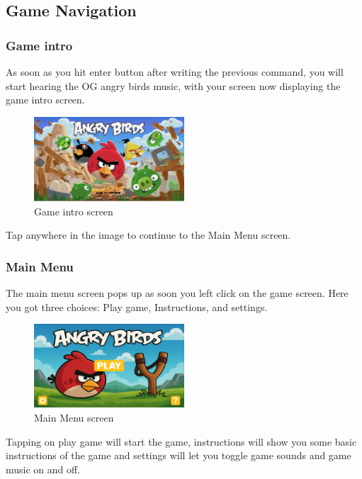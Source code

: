\documentclass[10pt]{article}
\begin{document}
\subsection{Game Navigation}\label{subsec:Game Navigation}
\subsubsection{Game intro}
As soon as you hit enter button after writing the previous command, you will start hearing the OG angry birds music, with your screen now displaying the game intro screen.

\begin{figure}[h!]
    \centering
    \includegraphics[width=0.5\textwidth]{assets/background-images/Angry_birds_loading_background.jpg}
    \caption{Game intro screen}
    \label{fig:game-intro}
\end{figure}

Tap anywhere in the image to continue to the Main Menu screen.


\subsubsection{Main Menu}
The main menu screen pops up as soon you left click on the game screen. Here you got three choices: Play game, Instructions, and settings.

\begin{figure}[h!]
    \centering
    \includegraphics[width=0.5\textwidth]{assets/report_images/main_menu.png}
    \caption{Main Menu screen}
    \label{fig:main-menu}
\end{figure}

Tapping on play game will start the game, instructions will show you some basic instructions of the game and settings will let you toggle game sounds and game music on and off.
\end{document}
